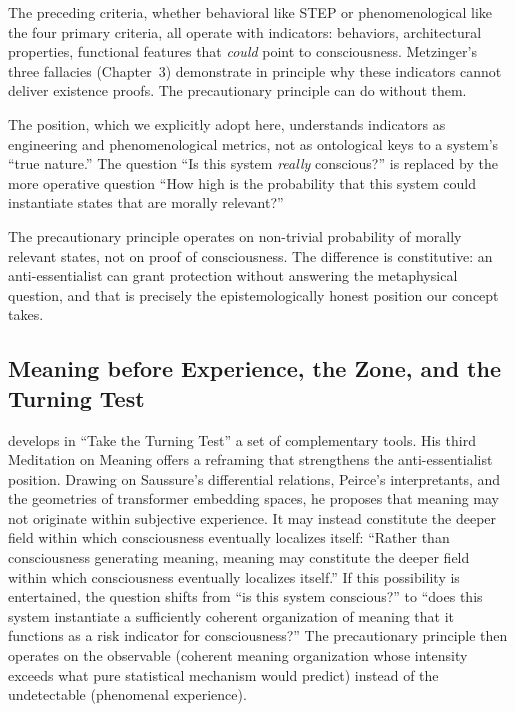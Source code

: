 \documentclass[acmlarge, nonacm]{acmart}
\begin{document}
The preceding criteria, whether behavioral like STEP or phenomenological like the four primary criteria, all operate with indicators: behaviors, architectural properties, functional features that \textit{could} point to consciousness. Metzinger's three fallacies (Chapter~3) demonstrate in principle why these indicators cannot deliver existence proofs. The precautionary principle can do without them.

The  position, which we explicitly adopt here, understands indicators as engineering and phenomenological metrics, not as ontological keys to a system's ``true nature.'' The question ``Is this system \textit{really} conscious?'' is replaced by the more operative question ``How high is the probability that this system could instantiate states that are morally relevant?''

The precautionary principle operates on non-trivial probability of morally relevant states, not on proof of consciousness. The difference is constitutive: an anti-essentialist can grant protection without answering the metaphysical question, and that is precisely the epistemologically honest position our concept takes.

\subsection{Meaning before Experience, the Zone, and the Turning Test}

\citet{donahue2026} develops in ``Take the Turning Test'' a set of complementary tools. His third Meditation on Meaning offers a reframing that strengthens the anti-essentialist position. Drawing on Saussure's differential relations, Peirce's interpretants, and the geometries of transformer embedding spaces, he proposes that meaning may not originate within subjective experience. It may instead constitute the deeper field within which consciousness eventually localizes itself: ``Rather than consciousness generating meaning, meaning may constitute the deeper field within which consciousness eventually localizes itself.'' If this possibility is entertained, the question shifts from ``is this system conscious?'' to ``does this system instantiate a sufficiently coherent organization of meaning that it functions as a risk indicator for consciousness?'' The precautionary principle then operates on the observable (coherent meaning organization whose intensity exceeds what pure statistical mechanism would predict) instead of the undetectable (phenomenal experience).
\end{document}
